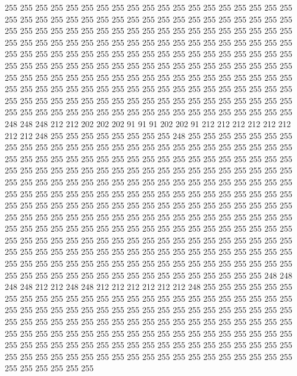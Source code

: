 255 255 255 255 255 255 255 255 255 255 255 255 255 255 255 255 255 255 255 255
255 255 255 255 255 255 255 255 255 255 255 255 255 255 255 255 255 255 255 255
255 255 255 255 255 255 255 255 255 255 255 255 255 255 255 255 255 255 255 255
255 255 255 255 255 255 255 255 255 255 255 255 255 255 255 255 255 255 255 255
255 255 255 255 255 255 255 255 255 255 255 255 255 255 255 255 255 255 255 255
255 255 255 255 255 255 255 255 255 255 255 255 255 255 255 255 255 255 255 255
255 255 255 255 255 255 255 255 255 255 255 255 255 255 255 255 255 255 255 255
255 255 255 255 255 255 255 255 255 255 255 255 255 255 255 255 255 255 255 255
255 255 255 255 255 255 255 255 255 255 255 255 255 255 255 255 255 255 255 255
255 255 255 255 255 255 255 255 255 255 248 248 248 212 212 202 202 202 91 91
91 202 202 91 212 212 212 212 212 212 212 212 248 255 255 255 255 255 255 255
255 248 255 255 255 255 255 255 255 255 255 255 255 255 255 255 255 255 255 255
255 255 255 255 255 255 255 255 255 255 255 255 255 255 255 255 255 255 255 255
255 255 255 255 255 255 255 255 255 255 255 255 255 255 255 255 255 255 255 255
255 255 255 255 255 255 255 255 255 255 255 255 255 255 255 255 255 255 255 255
255 255 255 255 255 255 255 255 255 255 255 255 255 255 255 255 255 255 255 255
255 255 255 255 255 255 255 255 255 255 255 255 255 255 255 255 255 255 255 255
255 255 255 255 255 255 255 255 255 255 255 255 255 255 255 255 255 255 255 255
255 255 255 255 255 255 255 255 255 255 255 255 255 255 255 255 255 255 255 255
255 255 255 255 255 255 255 255 255 255 255 255 255 255 255 255 255 255 255 255
255 255 255 255 255 255 255 255 255 255 255 255 255 255 255 255 255 255 255 255
255 255 255 255 255 255 255 255 255 255 255 255 255 255 255 255 255 255 255 255
255 255 255 255 255 255 255 255 255 255 255 255 255 255 255 248 248 248 248 212
212 248 248 212 212 212 212 212 212 248 255 255 255 255 255 255 255 255 255 255
255 255 255 255 255 255 255 255 255 255 255 255 255 255 255 255 255 255 255 255
255 255 255 255 255 255 255 255 255 255 255 255 255 255 255 255 255 255 255 255
255 255 255 255 255 255 255 255 255 255 255 255 255 255 255 255 255 255 255 255
255 255 255 255 255 255 255 255 255 255 255 255 255 255 255 255 255 255 255 255
255 255 255 255 255 255 255 255 255 255 255 255 255 255 255 255 255 255 255 255
255 255 255 255 255 255 255 255 255 255 255 255 255 255 255 255
